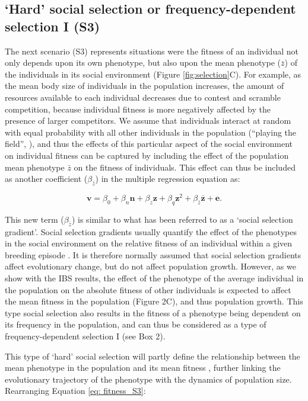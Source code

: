 \documentclass{article}
\begin{document}
	\subsection{`Hard' social selection or frequency-dependent selection I (S3)}
	The next scenario (S3) represents situations were the fitness of an individual not only depends upon its own phenotype, but also upon the mean phenotype ($\bar{z}$) of the individuals in its social environment (Figure \ref{fig:selection}C). For example, as the mean body size of individuals in the population increases, the amount of resources available to each individual decreases due to contest and scramble competition, because individual fitness is more negatively affected by the presence of larger competitors. We assume that individuals interact at random with equal probability with all other individuals in the population (“playing the field”, \cite{MaynardSmith1982}), and thus the effects of this particular aspect of the social environment on individual fitness can be captured by including the effect of the population mean phenotype $\bar{z}$ on the fitness of individuals. This effect can thus be included as another coefficient ($\beta_{\bar{z}}$) in the multiple regression equation as:  
	
	\begin{equation} \label{eq: fitness_S3}
	\bm{v}=\beta_{0} +\beta_{n} \bm{n} + \beta_{z} \bm{z} + \beta_{q} \bm{z}^2 + \beta_{\bar{z}} \bar{\bm{z}}+ \bm{e}.
	\end{equation}
	
	This new term ($\beta_{\bar{z}}$) is similar to what has been referred to as a `social selection gradient'. Social selection gradients usually quantify the effect of the phenotypes in the social environment on the relative fitness of an individual within a given breeding episode \citep{Wolf1999SocialSelection}. It is therefore normally assumed that social selection gradients affect evolutionary change, but do not affect population growth. However, as we show with the IBS results, the effect of the phenotype of the average individual in the population on the absolute fitness of other individuals is expected to affect the mean fitness in the population (Figure 2C), and thus population growth. This type social selection also results in the fitness of a phenotype being dependent on its frequency in the population, and can thus be considered as a type of frequency-dependent selection I (see Box 2). 
	
	This type of `hard' social selection will partly define the relationship between the mean phenotype in the population and its mean fitness \citep{Lande1976}, further linking the evolutionary trajectory of the phenotype with the dynamics of population size. Rearranging Equation \ref{eq: fitness_S3}:
	
\end{document}
